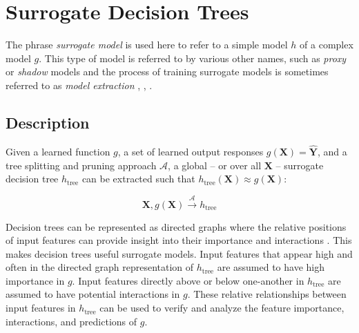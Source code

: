 \documentclass[sigconf, review]{acmart}
\begin{document}
\section{Surrogate Decision Trees} \label{sec:surrogate_dt}


The phrase \textit{surrogate model} is used here to refer to a simple model $h$ of a complex model $g$. This type of model is referred to by various other names, such as \textit{proxy} or \textit{shadow} models and the process of training surrogate models is sometimes referred to as \textit{model extraction} \cite{dt_surrogate1}, \cite{ff_interpretability},  \cite{dt_surrogate2}. 

\subsection{Description}

Given a learned function $g$, a set of learned output responses $g(\mathbf{X}) = \mathbf{\hat{Y}}$, and a tree splitting and pruning approach $\mathcal{A}$, a global -- or over all $\mathbf{X}$ -- surrogate decision tree $h_{\text{tree}}$ can be extracted such that $h_{\text{tree}}(\mathbf{X}) \approx g(\mathbf{X})$:

\begin{equation}
\mathbf{X}, g(\mathbf{X}) \xrightarrow{\mathcal{A}} h_{\text{tree}}
\end{equation}

Decision trees can be represented as directed graphs where the relative positions of input features can provide insight into their importance and interactions \cite{cart}. This makes decision trees useful surrogate models. Input features that appear high and often in the directed graph representation of $h_{\text{tree}}$ are assumed to have high importance in $g$. Input features directly above or below one-another in $h_{\text{tree}}$ are assumed to have potential interactions in $g$. These relative relationships between input features in $h_{\text{tree}}$ can be used to verify and analyze the feature importance, interactions, and predictions of $g$.
\end{document}
